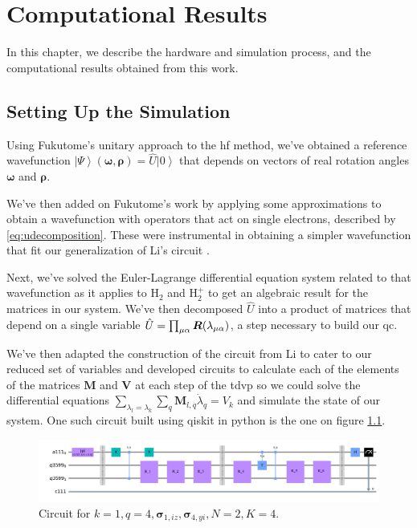 \documentclass{aux/ttuthes2007}
\newcommand{\ket}[1]{\ensuremath{\left|#1\right\rangle}}
\newcommand{\elec}{N}
\newcommand{\orb}{K}
\newcommand{\ind}[1]{{\uo #1 \oo #1}}
\newcommand{\uo}[1]{
		\IfEqCase{#1}{
			{0}{\mu}
			{1}{\nu}
			{2}{\xi}
		}[\PackageError{uo}{Undefined option to uo: #1}{}]
}
\newcommand{\oo}[1]{
		\IfEqCase{#1}{
			{0}{\alpha}
			{1}{\beta}
			{2}{\gamma}
		}[\PackageError{unocorb}{Undefined option to unuo: #1}{}]
}
\begin{document}
\chapter{\textbf{Computational Results}}\label{chap:compresults}

In this chapter, we describe the hardware and simulation process, and the computational results obtained from this work.

\section{\textbf{Setting Up the Simulation}}
Using Fukutome's  unitary approach to the \gls{hf} method, we've obtained a reference wavefunction $\ket \Psi(\bm \omega, \bm \rho) = \hat U\ket 0$ that depends on vectors of real rotation angles $\bm \omega$ and $\bm \rho$. 

We've then added on Fukutome's work by applying some approximations to obtain a wavefunction with operators that act on single electrons, described by \ref{eq:udecomposition}. These were instrumental in obtaining a simpler wavefunction that fit our generalization of Li's circuit .

Next, we've solved the Euler-Lagrange differential equation system related to that wavefunction as it applies to $\text{H}_2$ and $\text{H}_2^+$ to get an algebraic result for the matrices in our system.
We've then decomposed $\hat U$ into a product of matrices that depend on a single variable $\hat U = \prod_{\ind 0} \bm R(\lambda_{\ind 0})$, a step necessary to build our \gls{qc}.

We've then adapted the construction of the circuit from Li  to cater to our reduced set of variables and developed circuits to calculate each of the elements of the matrices $\bm M$ and $\bm V$ at each step of the \gls{tdvp} so we could solve the differential equations $\sum_{\lambda_l = \lambda_k} \sum_q \bm M_{l,q}\dot{\lambda}_q = V_k$ and simulate the state of our system. One such circuit built using qiskit in python is the one on figure \ref{fig:circuit}. 
\begin{figure}[hb!]
  \includegraphics[width=\linewidth]{img/circuit.jpg}
  \caption{Circuit for $k = 1, q = 4, \bm \sigma_{1, iz}, \bm \sigma_{4, yi}, \elec = 2, \orb = 4$.}
  \label{fig:circuit}
\end{figure}
\end{document}
